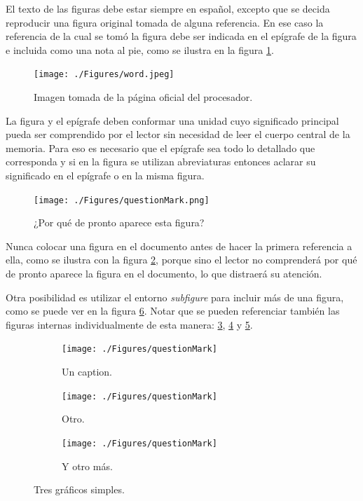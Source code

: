 El texto de las figuras debe estar siempre en español, excepto que se decida reproducir una figura original tomada de alguna referencia. En ese caso la referencia de la cual se tomó la figura debe ser indicada en el epígrafe de la figura e incluida como una nota al pie, como se ilustra en la figura \ref{fig:palabraIngles}.

\begin{figure}[htpb]
	\centering
	\texttt{[image: ./Figures/word.jpeg]}
	\caption{Imagen tomada de la página oficial del procesador\protect\footnotemark.}
	\label{fig:palabraIngles}
\end{figure}


La figura y el epígrafe deben conformar una unidad cuyo significado principal pueda ser comprendido por el lector sin necesidad de leer el cuerpo central de la memoria. Para eso es necesario que el epígrafe sea todo lo detallado que corresponda y si en la figura se utilizan abreviaturas entonces aclarar su significado en el epígrafe o en la misma figura.



\begin{figure}[ht]
	\centering
	\texttt{[image: ./Figures/questionMark.png]}
	\caption{¿Por qué de pronto aparece esta figura?}
	\label{fig:questionMark}
\end{figure}

Nunca colocar una figura en el documento antes de hacer la primera referencia a ella, como se ilustra con la figura \ref{fig:questionMark}, porque sino el lector no comprenderá por qué de pronto aparece la figura en el documento, lo que distraerá su atención.

Otra posibilidad es utilizar el entorno \textit{subfigure} para incluir más de una figura, como se puede ver en la figura \ref{fig:three graphs}. Notar que se pueden referenciar también las figuras internas individualmente de esta manera: \ref{fig:1de3}, \ref{fig:2de3} y \ref{fig:3de3}.
 
\begin{figure}[!htpb]
     \centering
     \begin{subfigure}[b]{0.3\textwidth}
         \centering
         \texttt{[image: ./Figures/questionMark]}
         \caption{Un caption.}
         \label{fig:1de3}
     \end{subfigure}
     \hfill
     \begin{subfigure}[b]{0.3\textwidth}
         \centering
         \texttt{[image: ./Figures/questionMark]}
         \caption{Otro.}
         \label{fig:2de3}
     \end{subfigure}
     \hfill
     \begin{subfigure}[b]{0.3\textwidth}
         \centering
         \texttt{[image: ./Figures/questionMark]}
         \caption{Y otro más.}
         \label{fig:3de3}
     \end{subfigure}
        \caption{Tres gráficos simples.}
        \label{fig:three graphs}
\end{figure}

